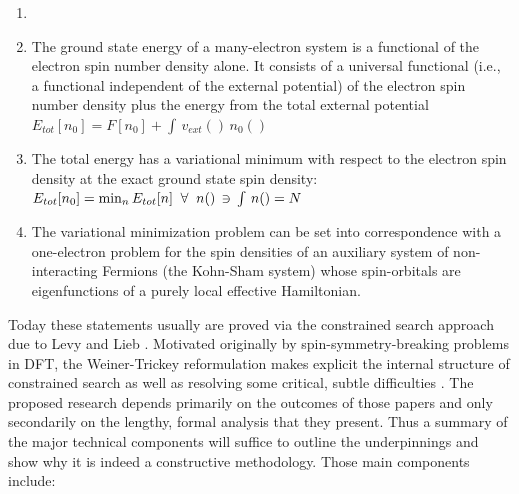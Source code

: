 \documentclass[nofootinbib,floatfix,aps,pra,preprint]{revtex4}
\begin{document}
\begin{enumerate}
\item \textrm{\vspace{-0.21cm} }

\item \textrm{The ground state energy of a many-electron system is a
functional of the electron spin number density alone. It consists of a
universal functional (i.e., a functional independent of the external
potential) of the electron spin number density plus the energy from the
total external potential $E_{tot}[n_{0}] = F[n_{0}] + \int {}{} \, v_{ext}({}%
) \, n_{0}({}) $ \vspace{-0.21cm} }

\item \textrm{The total energy has a variational minimum with respect to the
electron spin density at the exact ground state spin density: $%
E_{tot}[n_{0}] = \min_{n} E_{tot}[n] \;\; \forall \;\; n({}) \, \ni \, \int {%
}{}\, n({}) = N $ \vspace{-0.21cm} }

\item \textrm{The variational minimization problem can be set into
correspondence with a one-electron problem for the spin densities of an
auxiliary system of non-interacting Fermions (the Kohn-Sham system) whose
spin-orbitals are eigenfunctions of a purely local effective Hamiltonian. 
\vspace{-0.21cm} }
\end{enumerate}

\textrm{\renewcommand{\labelenumi}{\Alph{enumi}.} Today these statements
usually are proved via the constrained search approach due to Levy \cite%
{LevySem2,Levy79,LevyPerdew85} and Lieb \cite{Lieb}. Motivated originally by
spin-symmetry-breaking problems in DFT, the Weiner-Trickey reformulation
makes explicit the internal structure of constrained search as well as
resolving some critical, subtle difficulties \cite%
{BLWSBT97,BLWSBT98,BLWSBT99}. The proposed research depends primarily on the
outcomes of those papers and only secondarily on the lengthy, formal
analysis that they present. Thus a summary of the major technical components
will suffice to outline the underpinnings and show why it is indeed a
constructive methodology. Those main components include:\vspace{-0.07cm} }
\end{document}

